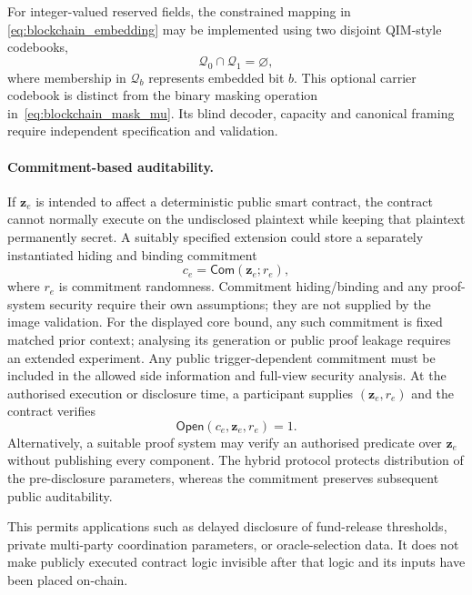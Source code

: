 \documentclass[journal]{IEEEtran}
\theoremstyle{definition}
\theoremstyle{game}
\begin{document}
For integer-valued reserved fields, the constrained mapping in
\eqref{eq:blockchain_embedding} may be implemented using two
disjoint QIM-style codebooks,
\begin{equation}
\mathcal{Q}_{0}
\cap
\mathcal{Q}_{1}
=
\varnothing,
\end{equation}
where membership in $\mathcal{Q}_{b}$ represents embedded bit
$b$. This optional carrier codebook is distinct from the binary masking
operation in~\eqref{eq:blockchain_mask_mu}. Its blind decoder, capacity and
canonical framing require independent specification and validation.

\paragraph{Commitment-based auditability.}
If $\mathbf{z}_e$ is intended to affect a deterministic public
smart contract, the contract cannot normally execute on the
undisclosed plaintext while keeping that plaintext permanently
secret. A suitably specified extension could store a separately instantiated
hiding and binding commitment
\begin{equation}
\label{eq:blockchain_commitment}
c_e
=
\mathsf{Com}
\left(
\mathbf{z}_e;r_e
\right),
\end{equation}
where $r_e$ is commitment randomness. Commitment hiding/binding and any
proof-system security require their own assumptions; they are not supplied
by the image validation. For the displayed core bound, any such commitment
is fixed matched prior context; analysing its generation or public proof
leakage requires an extended experiment. Any public trigger-dependent commitment must be
included in the allowed side information and full-view security analysis. At the authorised execution
or disclosure time, a participant supplies
$(\mathbf{z}_e,r_e)$ and the contract verifies
\begin{equation}
\label{eq:blockchain_commitment_open}
\mathsf{Open}
\left(
c_e,\mathbf{z}_e,r_e
\right)
=1.
\end{equation}
Alternatively, a suitable proof system may verify an authorised
predicate over $\mathbf{z}_e$ without publishing every component.
The hybrid protocol protects distribution of the pre-disclosure
parameters, whereas the commitment preserves subsequent public
auditability.

This permits applications such as delayed disclosure of
fund-release thresholds, private multi-party coordination
parameters, or oracle-selection data. It does not make publicly
executed contract logic invisible after that logic and its inputs
have been placed on-chain.
\end{document}
